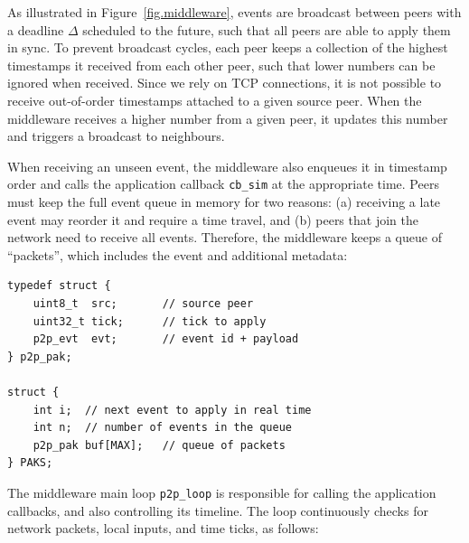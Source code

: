 \documentclass[12pt]{article}
\newcommand{\code}[1]  {\texttt{\small{#1}}}
\begin{document}
As illustrated in Figure~\ref{fig.middleware}, events are broadcast between
peers with a deadline $\Delta$ scheduled to the future, such that all peers are
able to apply them in sync.
%
To prevent broadcast cycles, each peer keeps a collection of the highest
timestamps it received from each other peer, such that lower numbers can be
ignored when received.
Since we rely on TCP connections, it is not possible to receive out-of-order
timestamps attached to a given source peer.
When the middleware receives a higher number from a given peer, it updates this
number and triggers a broadcast to neighbours.
%

When receiving an unseen event, the middleware also enqueues it in timestamp
order and calls the application callback \code{cb\_sim} at the appropriate
time.
Peers must keep the full event queue in memory for two reasons:
    (a) receiving a late event may reorder it and require a time travel, and
    (b) peers that join the network need to receive all events.
%
Therefore, the middleware keeps a queue of ``packets'', which includes the
event and additional metadata:

{\footnotesize
\begin{verbatim}
typedef struct {
    uint8_t  src;       // source peer
    uint32_t tick;      // tick to apply
    p2p_evt  evt;       // event id + payload
} p2p_pak;

struct {
    int i;  // next event to apply in real time
    int n;  // number of events in the queue
    p2p_pak buf[MAX];   // queue of packets
} PAKS;
\end{verbatim}
}


The middleware main loop \code{p2p\_loop} is responsible for calling the
application callbacks, and also controlling its timeline.
The loop continuously checks for network packets, local inputs, and time ticks,
as follows:
\end{document}
